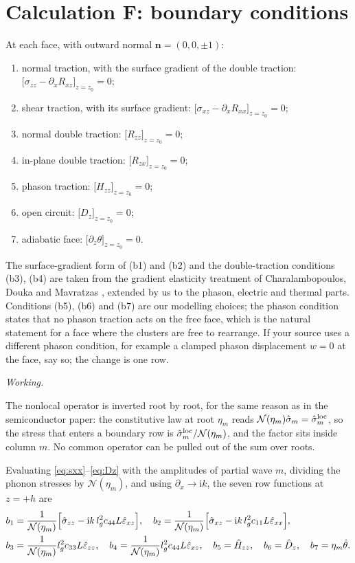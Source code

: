 \documentclass[11pt,a4paper]{article}
\newif\ifshowworked \showworkedtrue
\newenvironment{worked}{\ifshowworked\par\smallskip\noindent\textit{Working.}\par\else\setbox0\vbox\bgroup\fi}{\ifshowworked\par\smallskip\else\egroup\fi}
\newcommand{\Nc}{\mathcal{N}}
\newcommand{\eps}{\varepsilon}
\newcommand{\ii}{\mathrm{i}}
\newcommand{\bt}{\hat\theta}
\begin{document}
\section{Calculation F: boundary conditions}\label{sec:F}

At each face, with outward normal $\mathbf n=(0,0,\pm1)$:

\begin{enumerate}
\item[(b1)] normal traction, with the surface gradient of the double traction:
$\bigl[\sigma_{zz}-\partial_xR_{xz}\bigr]_{z=z_0}=0$;
\item[(b2)] shear traction, with its surface gradient:
$\bigl[\sigma_{xz}-\partial_xR_{xx}\bigr]_{z=z_0}=0$;
\item[(b3)] normal double traction: $\bigl[R_{zz}\bigr]_{z=z_0}=0$;
\item[(b4)] in-plane double traction: $\bigl[R_{zx}\bigr]_{z=z_0}=0$;
\item[(b5)] phason traction: $\bigl[H_{zz}\bigr]_{z=z_0}=0$;
\item[(b6)] open circuit: $\bigl[D_z\bigr]_{z=z_0}=0$;
\item[(b7)] adiabatic face: $\bigl[\partial_z\theta\bigr]_{z=z_0}=0$.
\end{enumerate}

The surface-gradient form of (b1) and (b2) and the double-traction conditions (b3), (b4) are taken from the
gradient elasticity treatment of Charalambopoulos, Douka and Mavratzas
\cite[Sec.~2, Eq.~(14)]{Charalambopoulos2019}, extended by us to the phason, electric and thermal parts.
Conditions (b5), (b6) and (b7) are our modelling choices; the phason condition states that no phason
traction acts on the free face, which is the natural statement for a face where the clusters are free to
rearrange. If your source uses a different phason condition, for example a clamped phason displacement
$w=0$ at the face, say so; the change is one row.

\begin{worked}
The nonlocal operator is inverted root by root, for the same reason as in the semiconductor paper: the
constitutive law at root $\eta_m$ reads $\Nc(\eta_m)\hat\sigma_m=\hat\sigma^{\rm loc}_m$, so the stress that
enters a boundary row is $\hat\sigma^{\rm loc}_m/\Nc(\eta_m)$, and the factor sits inside column $m$. No
common operator can be pulled out of the sum over roots.
\end{worked}

\noindent Evaluating \eqref{eq:sxx}--\eqref{eq:Dz} with the amplitudes of partial wave $m$, dividing the
phonon stresses by $\Nc(\eta_m)$, and using $\partial_x\to\ii k$, the seven row functions at $z=+h$ are
\begin{align}
b_1&=\frac{1}{\Nc(\eta_m)}\Bigl[\hat\sigma_{zz}-\ii k\,l_g^2c_{44}L\hat\eps_{xz}\Bigr],\quad
b_2=\frac{1}{\Nc(\eta_m)}\Bigl[\hat\sigma_{xz}-\ii k\,l_g^2c_{11}L\hat\eps_{xx}\Bigr],
\label{eq:b12}\\
b_3&=\frac{1}{\Nc(\eta_m)}l_g^2c_{33}L\hat\eps_{zz},\quad
b_4=\frac{1}{\Nc(\eta_m)}l_g^2c_{44}L\hat\eps_{xz},\quad
b_5=\hat H_{zz},\quad b_6=\hat D_z,\quad b_7=\eta_m\bt .
\label{eq:b34567}
\end{align}
\end{document}
